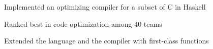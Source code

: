 \documentclass[letterpaper]{deedy-resume} %
\begin{document}
\begin{minipage}[t]{0.66\textwidth}
\sectionspace %



\begin{tightitemize}
\item Implemented an optimizing compiler for a subset of C in Haskell
\item Ranked  best in code optimization among 40 teams
\item Extended the language and the compiler with first-class functions
\end{tightitemize}


\end{minipage} %
\hfill
%
%
\end{document}
